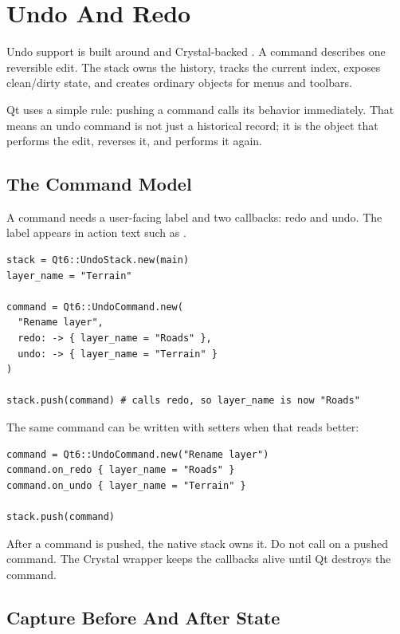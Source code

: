 \chapter{Undo And Redo}

Undo support is built around  and Crystal-backed . A command describes one reversible edit. The stack owns the history, tracks the current index, exposes clean/dirty state, and creates ordinary  objects for menus and toolbars.

Qt uses a simple rule: pushing a command calls its  behavior immediately. That means an undo command is not just a historical record; it is the object that performs the edit, reverses it, and performs it again.

\section{The Command Model}

A command needs a user-facing label and two callbacks: redo and undo. The label appears in action text such as .

\begin{lstlisting}[style=crystal]
stack = Qt6::UndoStack.new(main)
layer_name = "Terrain"

command = Qt6::UndoCommand.new(
  "Rename layer",
  redo: -> { layer_name = "Roads" },
  undo: -> { layer_name = "Terrain" }
)

stack.push(command) # calls redo, so layer_name is now "Roads"
\end{lstlisting}

The same command can be written with setters when that reads better:

\begin{lstlisting}[style=crystal]
command = Qt6::UndoCommand.new("Rename layer")
command.on_redo { layer_name = "Roads" }
command.on_undo { layer_name = "Terrain" }

stack.push(command)
\end{lstlisting}

After a command is pushed, the native stack owns it. Do not call  on a pushed command. The Crystal wrapper keeps the callbacks alive until Qt destroys the command.

\section{Capture Before And After State}


